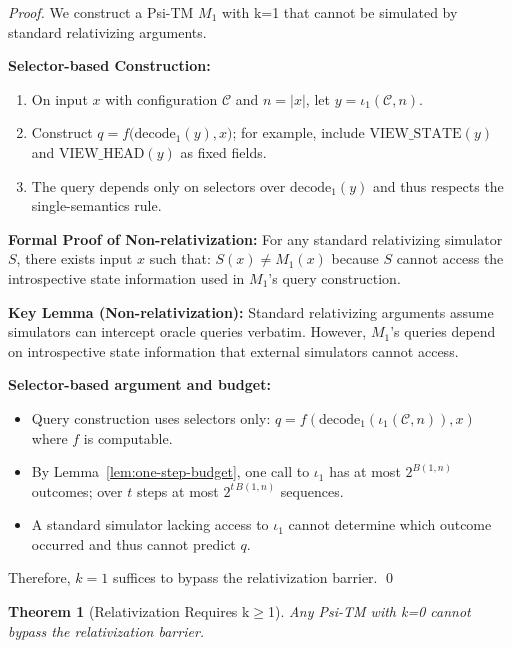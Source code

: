 \documentclass[11pt]{article}
\newtheorem{theorem}{Theorem}[section]
\theoremstyle{definition}
\newcommand{\len}[1]{\left|#1\right|}
\begin{document}
\begin{proof}
We construct a Psi-TM $M_1$ with k=1 that cannot be simulated by standard relativizing arguments.

\textbf{Selector-based Construction:}
\begin{enumerate}
\item On input $x$ with configuration $\mathcal{C}$ and $n=\len{x}$, let $y=\iota_1(\mathcal{C},n)$.
\item Construct $q = f\big(\mathrm{decode}_1(y), x\big)$; for example, include $\mathrm{VIEW\_STATE}(y)$ and $\mathrm{VIEW\_HEAD}(y)$ as fixed fields.
\item The query depends only on selectors over $\mathrm{decode}_1(y)$ and thus respects the single-semantics rule.
\end{enumerate}

\textbf{Formal Proof of Non-relativization:}
For any standard relativizing simulator $S$, there exists input $x$ such that:
$S(x) \neq M_1(x)$ because $S$ cannot access the introspective state information used in $M_1$'s query construction.

\textbf{Key Lemma (Non-relativization):} Standard relativizing arguments assume simulators can intercept oracle queries verbatim. However, $M_1$'s queries depend on introspective state information that external simulators cannot access.

\textbf{Selector-based argument and budget:}
\begin{itemize}
\item Query construction uses selectors only: $q = f(\mathrm{decode}_1(\iota_1(\mathcal{C},n)), x)$ where $f$ is computable.
\item By Lemma~\ref{lem:one-step-budget}, one call to $\iota_1$ has at most $2^{B(1,n)}$ outcomes; over $t$ steps at most $2^{t\,B(1,n)}$ sequences.
\item A standard simulator lacking access to $\iota_1$ cannot determine which outcome occurred and thus cannot predict $q$.
\end{itemize}

Therefore, $k=1$ suffices to bypass the relativization barrier. \qed
\end{proof}

\begin{theorem}[Relativization Requires k$\geq$1]
\label{thm:relativization-k0}
Any Psi-TM with k=0 cannot bypass the relativization barrier.
\end{theorem}
\end{document}
